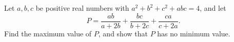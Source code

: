 Let $a,b,c$ be positive real numbers with $a^2+b^2+c^2+abc=4$, and let
\[
P=\dfrac{ab}{a+2b}+\dfrac{bc}{b+2c}+\dfrac{ca}{c+2a}.
\]
Find the maximum value of $P$, and show that $P$ has no minimum value.
